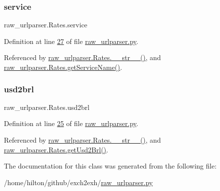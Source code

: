 \subsubsection{\texorpdfstring{service}{service}}
{\footnotesize\ttfamily raw\+\_\+urlparser.\+Rates.\+service}



Definition at line \hyperlink{raw__urlparser_8py_source_l00027}{27} of file \hyperlink{raw__urlparser_8py_source}{raw\+\_\+urlparser.\+py}.



Referenced by \hyperlink{raw__urlparser_8py_source_l00038}{raw\+\_\+urlparser.\+Rates.\+\_\+\+\_\+str\+\_\+\+\_\+()}, and \hyperlink{raw__urlparser_8py_source_l00035}{raw\+\_\+urlparser.\+Rates.\+get\+Service\+Name()}.

\mbox{\label{classraw__urlparser_1_1_rates_a52d9b688be8385a87783b27839749b4a}} 
\subsubsection{\texorpdfstring{usd2brl}{usd2brl}}
{\footnotesize\ttfamily raw\+\_\+urlparser.\+Rates.\+usd2brl}



Definition at line \hyperlink{raw__urlparser_8py_source_l00025}{25} of file \hyperlink{raw__urlparser_8py_source}{raw\+\_\+urlparser.\+py}.



Referenced by \hyperlink{raw__urlparser_8py_source_l00038}{raw\+\_\+urlparser.\+Rates.\+\_\+\+\_\+str\+\_\+\+\_\+()}, and \hyperlink{raw__urlparser_8py_source_l00032}{raw\+\_\+urlparser.\+Rates.\+get\+Usd2\+Brl()}.



The documentation for this class was generated from the following file\+:\begin{DoxyCompactItemize}
\item 
/home/hilton/github/exch2exh/\hyperlink{raw__urlparser_8py}{raw\+\_\+urlparser.\+py}\end{DoxyCompactItemize}
